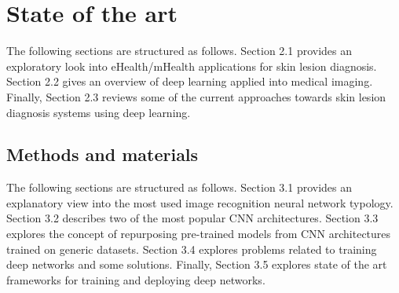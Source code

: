 

\chapter{State of the art}
\label{chapter:sota}

The following sections are structured as follows. Section 2.1 provides an exploratory look into eHealth/mHealth applications for skin lesion diagnosis. Section 2.2 gives an overview of deep learning applied into medical imaging. Finally, Section 2.3 reviews some of the current approaches towards skin lesion diagnosis systems using deep learning.


\section{Methods and materials}
The following sections are structured as follows. Section 3.1 provides an explanatory view into the most used image recognition neural network typology. Section 3.2 describes two of the most popular \ac{CNN} architectures. Section 3.3 explores the concept of repurposing pre-trained models from \ac{CNN} architectures trained on generic datasets. Section 3.4 explores problems related to training deep networks and some solutions. Finally, Section 3.5 explores state of the art frameworks for training and deploying deep networks.   
